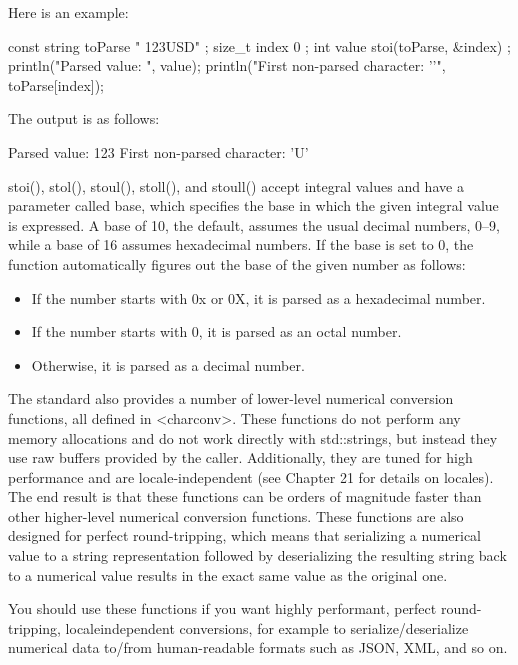 Here is an example:

\begin{cpp}
const string toParse { " 123USD" };
size_t index { 0 };
int value { stoi(toParse, &index) };
println("Parsed value: {}", value);
println("First non-parsed character: '{}'", toParse[index]);
\end{cpp}

The output is as follows:

\begin{shell}
Parsed value: 123
First non-parsed character: 'U'
\end{shell}

stoi(), stol(), stoul(), stoll(), and stoull() accept integral values and have a parameter called base, which specifies the base in which the given integral value is expressed. A base of 10, the default, assumes the usual decimal numbers, 0–9, while a base of 16 assumes hexadecimal numbers. If the base is set to 0, the function automatically figures out the base of the given number as follows:

\begin{itemize}
\item
If the number starts with 0x or 0X, it is parsed as a hexadecimal number.

\item
If the number starts with 0, it is parsed as an octal number.

\item
Otherwise, it is parsed as a decimal number.
\end{itemize}


The standard also provides a number of lower-level numerical conversion functions, all defined in <charconv>. These functions do not perform any memory allocations and do not work directly with std::strings, but instead they use raw buffers provided by the caller. Additionally, they are tuned for high performance and are locale-independent (see Chapter 21 for details on locales). The end result is that these functions can be orders of magnitude faster than other higher-level numerical conversion functions. These functions are also designed for perfect round-tripping, which means that serializing a numerical value to a string representation followed by deserializing the resulting string back to a numerical value results in the exact same value as the original one.

You should use these functions if you want highly performant, perfect round-tripping, localeindependent conversions, for example to serialize/deserialize numerical data to/from human-readable formats such as JSON, XML, and so on.


